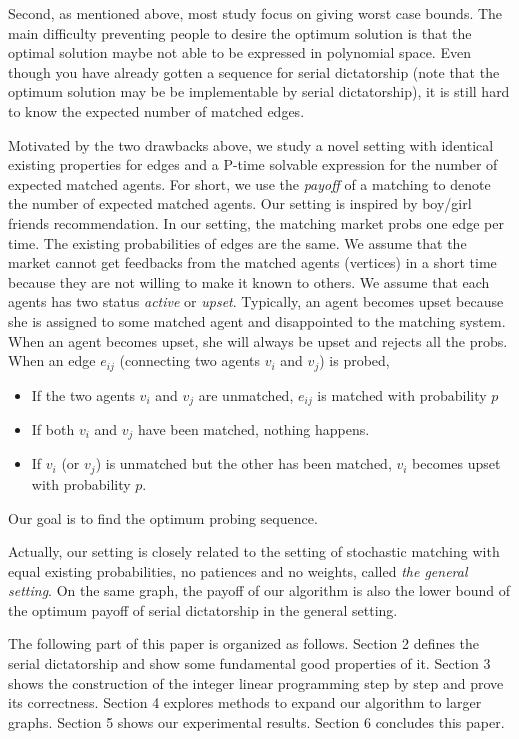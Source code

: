 \documentclass[letterpaper]{article}
\begin{document}
Second, as mentioned above, most study focus on giving worst case bounds. 
The main difficulty preventing people to desire the optimum solution is that the optimal solution maybe not able to be expressed in polynomial space.
Even though you have already gotten a sequence for serial dictatorship (note that the optimum solution may be be implementable by serial dictatorship), it is still hard to know the expected number of matched edges. 

Motivated by the two drawbacks above, we study a novel setting with identical existing properties for edges and a P-time solvable expression for the number of expected matched agents.
For short, we use the \textit{payoff} of a matching to denote the number of expected matched agents.
Our setting is inspired by boy/girl friends recommendation.
In our setting, the matching market probs one edge per time.
The existing probabilities of edges are the same.
We assume that the market cannot get feedbacks from the matched agents (vertices) in a short time because they are not willing to make it known to others.
We assume that each agents has two status \textit{active} or \textit{upset}.
Typically, an agent becomes upset because she is assigned to some matched agent and disappointed to the matching system.
When an agent becomes upset, she will always be upset and rejects all the probs. 
When an edge $e_{ij}$ (connecting two agents $v_i$ and $v_j$) is probed,
\begin{itemize}
	\item If the two agents $v_i$ and $v_j$ are unmatched, $e_{ij}$ is matched with probability $p$
	\item  If both $v_i$ and $v_j$ have been matched, nothing happens.
	\item If $v_i$ (or $v_j$) is unmatched but the other has been matched, $v_i$ becomes upset with probability $p$.
\end{itemize}
Our goal is to find the optimum probing sequence.

Actually, our setting is closely related to the setting of stochastic matching with equal existing probabilities, no patiences and no weights, called \textit{the general setting}. On the same graph, the payoff of our algorithm is also the lower bound of the optimum payoff of serial dictatorship in the general setting. 

The following part of this paper is organized as follows. Section 2 defines the serial dictatorship and show some fundamental good properties of it. Section 3 shows the construction of the integer linear programming step by step and prove its correctness. Section 4 explores methods to expand our algorithm to larger graphs. Section 5 shows our experimental results. Section 6 concludes this paper.
\end{document}

